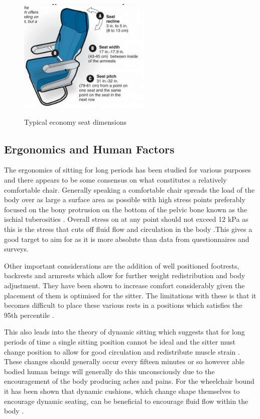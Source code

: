 \documentclass[conference]{IEEEtran}
\begin{document}
\begin{figure}[!t]
\centering
    \caption{Typical economy seat dimensions}
 \includegraphics[width=2.5in]{pics/seatSpecs.png} 
    \label{seatSpecs}
\end{figure}

    \subsection{Ergonomics and Human Factors}
    The ergonomics of sitting for long periods has been studied for various purposes and there appears to be some consensus on what constitutes a relatively comfortable chair. Generally speaking a comfortable chair spreads the load of the body over as large a surface area as possible with high stress points preferably focused on the bony protrusion on the bottom of the pelvic bone known as the ischial tuberosities \cite{HermanMiller2013}. Overall stress on at any point should not exceed 12 kPa as this is the stress that cuts off fluid flow and circulation in the body \cite{Nigel2002}.This gives a good target to aim for as it is more absolute than data from questionnaires and surveys.
    
    Other important considerations are the addition of well positioned footrests, backrests and armrests \cite{Graf1993, drury1982} which allow for further weight redistribution and body adjustment. They have been shown to increase comfort considerably given the placement of them is optimised for the sitter. The limitations with these is that it becomes difficult to place these various rests in a positions which satisfies the 95th percentile \cite{drury1982}.
    
    This also leads into the theory of dynamic sitting which suggests that for long periods of time a single sitting position cannot be ideal and the sitter must change position to allow for good circulation and redistribute muscle strain \cite{Stockton2008}. These changes should generally occur every fifteen minutes or so however able bodied human beings will generally do this unconsciously due to the encouragement of the body producing aches and pains. For the wheelchair bound it has been shown that dynamic cushions, which change shape themselves to encourage dynamic seating, can be beneficial to encourage fluid flow within the body \cite{Stockton2008}.
        
\end{document}
